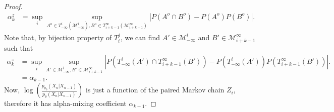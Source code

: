 \documentclass[11pt]{amsart}
\begin{document}
\begin{proof}
\begin{align*}
    \alpha^z_k & = \underset{i}{\sup}\underset{A^o \in T_{-\infty}^{i}(\mathcal{M}_{-\infty}^{i}) ,B^o\in T_{i+k-1}^{\infty}(\mathcal{M}_{i+k-1}^{\infty})}{\sup}|P(A^o\cap B^o)-P(A^o)P(B^o)|.
\end{align*}
Note that, by bijection property of $T_i^j$, we can find $A' \in \mathcal{M}_{-\infty}^{i}$ and $B' \in \mathcal{M}_{i+k-1}^{\infty}$ such that
\begin{align*}
     \alpha^z_k & = \underset{i}{\sup}\underset{A' \in \mathcal{M}_{-\infty}^{i} ,B'\in \mathcal{M}_{i+k-1}^{\infty}}{\sup}|P(T_{-\infty}^{i}(A')\cap T_{i+k-1}^{\infty}(B'))-P(T_{-\infty}^{i}(A'))P(T_{i+k-1}^{\infty}(B'))|.\\
      & = \alpha_{k-1}.
\end{align*}
Now, $\log \left( \frac{ p_{\theta_0}(X_n|X_{n-1}) } { p_{\theta}(X_n|X_{n-1}) } \right)$ is just a function of the paired Markov chain $Z_i$, therefore it has alpha-mixing coefficient $\alpha_{k-1}$.
\end{proof}
\end{document}

